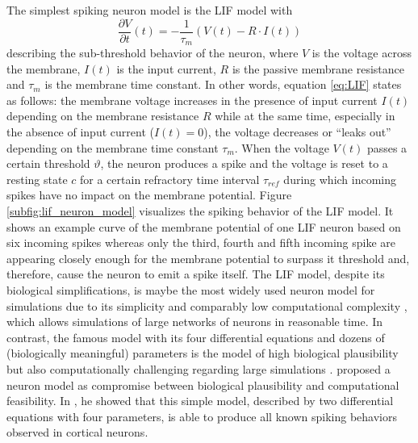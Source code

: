 The simplest spiking neuron model is the \acf{LIF} model with
\begin{equation}
\frac{\partial V}{\partial t}(t) = - \frac{1}{\tau_{m}} \left( V\left(t\right) - R \cdot I\left(t\right) \right)
\label{eq:LIF}
\end{equation}
describing the sub-threshold behavior of the neuron, where $V$ is the voltage across the membrane, $I(t)$ is the input current, $R$ is the passive membrane resistance and $\tau_{m}$ is the membrane time constant.
In other words, equation \ref{eq:LIF} states as follows: the membrane voltage increases in the presence of input current $I(t)$ depending on the membrane resistance $R$ while at the same time, especially in the absence of input current ($I(t)=0$), the voltage decreases or \enquote{leaks out} depending on the membrane time constant $\tau_{m}$.
When the voltage $V(t)$ passes a certain threshold $\vartheta$, the neuron produces a spike and the voltage is reset to a resting state $c$ for a certain refractory time interval $\tau_{ref}$ during which incoming spikes have no impact on the membrane potential.
Figure \ref{subfig:lif_neuron_model} visualizes the spiking behavior of the \ac{LIF} model.
It shows an example curve of the membrane potential of one \ac{LIF} neuron based on six incoming spikes whereas only the third, fourth and fifth incoming spike are appearing closely enough for the membrane potential to surpass it threshold and, therefore, cause the neuron to emit a spike itself.
The \ac{LIF} model, despite its biological simplifications, is maybe the most widely used neuron model for simulations due to its simplicity and comparably low computational complexity \parencite{Izhikevich2004}, which allows simulations of large networks of neurons in reasonable time.
In contrast, the famous \textcite{Hodgkin1952} model with its four differential equations and dozens of (biologically meaningful) parameters is the model of high biological plausibility but also computationally challenging regarding large simulations \parencite{Izhikevich2004}.
\textcite{Izhikevich2003} proposed a neuron model  as compromise between biological plausibility and computational feasibility.
In \textcite{Izhikevich2004}, he showed that this simple model, described by two differential equations with four parameters, is able to produce all known spiking behaviors observed in cortical neurons. 

